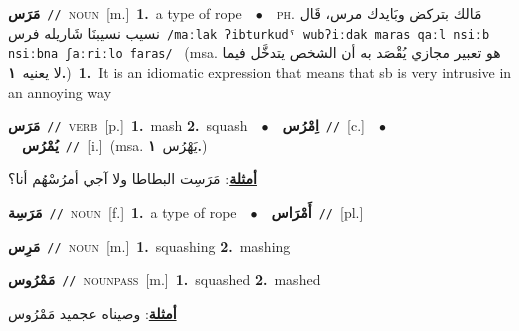 \documentclass[10pt,a4paper,twoside]{article} %
\begin{document}
\begin{multicols}{2}
{\setlength\topsep{0pt}\textbf{\foreignlanguage{arabic}{مَرَس}}\ {\color{gray}\texttt{//}\color{black}}\ \textsc{noun}\ [m.]\ \textbf{1.}~a type of rope\ \ $\bullet$\ \ \textsc{ph.} \color{gray} \foreignlanguage{arabic}{مَالك بتركض وبَايدك مرس، قَال نسيب نسيبنَا شَاريله فرس}\color{black}\ {\color{gray}\texttt{/{\sffamily maːlak ʔibturkudˤ wubʔiːdak maras qaːl nsiːb nsiːbna ʃaːriːlo faras}/}\color{black}}\ \color{gray} (msa. \foreignlanguage{arabic}{هو تعبير مجازي يُقْصَد به أن الشخص يتدخَّل فيما لا يعنيه}~\foreignlanguage{arabic}{\textbf{١.}})\color{black}\ \textbf{1.}~It is an idiomatic expression that means that sb is very intrusive in an annoying way\ } \vspace{2mm}

{\setlength\topsep{0pt}\textbf{\foreignlanguage{arabic}{مَرَس}}\ {\color{gray}\texttt{//}\color{black}}\ \textsc{verb}\ [p.]\ \textbf{1.}~mash  \textbf{2.}~squash\ \ $\bullet$\ \ \setlength\topsep{0pt}\textbf{\foreignlanguage{arabic}{اِمْرُس}}\ {\color{gray}\texttt{//}\color{black}}\ [c.]\ \ $\bullet$\ \ \setlength\topsep{0pt}\textbf{\foreignlanguage{arabic}{يُمْرُس}}\ {\color{gray}\texttt{//}\color{black}}\ [i.]\ \color{gray}(msa. \foreignlanguage{arabic}{يَهْرُس}~\foreignlanguage{arabic}{\textbf{١.}})\color{black}\  \begin{flushright}\color{gray}\foreignlanguage{arabic}{\textbf{\underline{\foreignlanguage{arabic}{أمثلة}}}: مَرَسِت البطاطا ولا آجي أمرُسْهُم أنا؟}\end{flushright}\color{black}} \vspace{2mm}

{\setlength\topsep{0pt}\textbf{\foreignlanguage{arabic}{مَرَسِة}}\ {\color{gray}\texttt{//}\color{black}}\ \textsc{noun}\ [f.]\ \textbf{1.}~a type of rope\ \ $\bullet$\ \ \setlength\topsep{0pt}\textbf{\foreignlanguage{arabic}{أَمْرَاس}}\ {\color{gray}\texttt{//}\color{black}}\ [pl.]\ } \vspace{2mm}

{\setlength\topsep{0pt}\textbf{\foreignlanguage{arabic}{مَرِس}}\ {\color{gray}\texttt{//}\color{black}}\ \textsc{noun}\ [m.]\ \textbf{1.}~squashing  \textbf{2.}~mashing\ } \vspace{2mm}

{\setlength\topsep{0pt}\textbf{\foreignlanguage{arabic}{مَمْرُوس}}\ {\color{gray}\texttt{//}\color{black}}\ \textsc{noun\textunderscore pass}\ [m.]\ \textbf{1.}~squashed  \textbf{2.}~mashed\  \begin{flushright}\color{gray}\foreignlanguage{arabic}{\textbf{\underline{\foreignlanguage{arabic}{أمثلة}}}: وصيناه عجميد مَمْرُوس}\end{flushright}\color{black}} \vspace{2mm}


\end{multicols}
\end{document}
